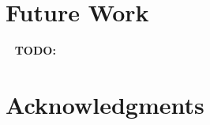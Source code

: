 \documentclass[11pt,a4paper]{article}
\begin{document}
\section{Future Work}\label{future}



\ \newline
\textbf{TODO:}
\ \newline




\section*{Acknowledgments}

\ \newline
\newpage


\end{document}

